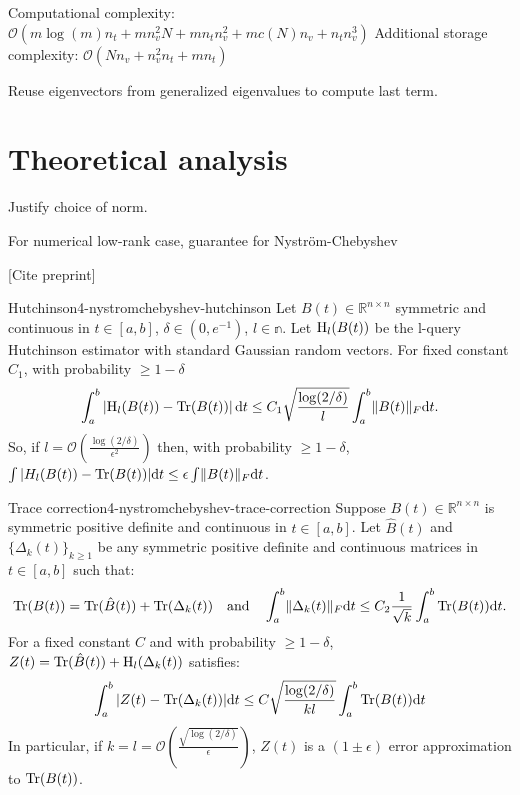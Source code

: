 Computational complexity: $\mathcal{O}(m \log(m) n_t + m n_v^2 N + m n_t n_v^2 +  m c(N) n_v + n_t n_v^3)$
Additional storage complexity: $\mathcal{O}(N n_v + n_v^2 n_t + m n_t)$

Reuse eigenvectors from generalized eigenvalues to compute last term.


\section{Theoretical analysis}
\label{sec:4-nystromchebyshev-analysis}

Justify choice of norm.

For numerical low-rank case, guarantee for Nystr\"om-Chebyshev \cite[Theorem~9]{kressner2023randomized}

[Cite preprint]

\begin{lemma}{Hutchinson}{4-nystromchebyshev-hutchinson}
    Let $B(t) \in \mathbb{R}^{n \times n}$ symmetric and continuous in $t \in [a, b]$, $\delta \in (0, e^{-1})$, $l \in \mathbb{n}$. Let $\operatorname{H}_{l}(B(t))$ be the l-query Hutchinson estimator with standard Gaussian random vectors. For fixed constant $C_1$, with probability $\geq 1 - \delta$
    \begin{equation}
        \int_{a}^{b} \left| \operatorname{H}_{l}(B(t))  - \operatorname{Tr}(B(t)) \right| \mathrm{d}t \leq C_1 \sqrt{\frac{\log(2/\delta)}{l}} \int_{a}^{b} \lVert B(t) \rVert_F \mathrm{d}t.
    \end{equation}
    So, if $l = \mathcal{O}\left( \frac{\log(2/\delta)}{\epsilon^2} \right)$ then, with probability $\geq 1 - \delta$, $\int |H_l(B(t)) - \operatorname{Tr}(B(t))| \mathrm{d}t \leq \epsilon \int \lVert B(t) \rVert_F \mathrm{d}t$.
\end{lemma}

\begin{theorem}{Trace correction}{4-nystromchebyshev-trace-correction}
    Suppose $B(t) \in \mathbb{R}^{n \times n}$ is symmetric positive definite and continuous in $t \in [a, b]$. Let $\hat{B}(t)$ and $\{\Delta_k(t)\}_{k \geq 1}$ be any symmetric positive definite and continuous matrices in $t \in [a, b]$ such that:
    \begin{equation}
        \operatorname{Tr}(B(t)) = \operatorname{Tr}(\hat{B}(t)) + \operatorname{Tr}(\Delta_k(t)) \quad \text{and} \quad
        \int_{a}^{b} \lVert \Delta_k(t) \rVert _F \mathrm{d}t \leq C_2\frac{1}{\sqrt{k}} \int_{a}^{b} \operatorname{Tr}(B(t)) \mathrm{d}t.
    \end{equation}
    For a fixed constant $C$ and with probability $\geq 1 - \delta$, $Z(t) = \operatorname{Tr}(\hat{B}(t)) + \operatorname{H}_l(\Delta_k(t))$ satisfies:
    \begin{equation}
        \int_{a}^{b} |Z(t) - \operatorname{Tr}(\Delta_k(t))| \mathrm{d}t \leq C \sqrt{\frac{\log(2/\delta)}{kl}} \int_{a}^{b} \operatorname{Tr}(B(t)) \mathrm{d}t
    \end{equation}
    In particular, if $k=l=\mathcal{O}\left( \frac{\sqrt{\log(2/\delta)}}{\epsilon} \right)$, $Z(t)$ is a $(1 \pm \epsilon)$ error approximation to $\operatorname{Tr}(B(t))$.
\end{theorem}

